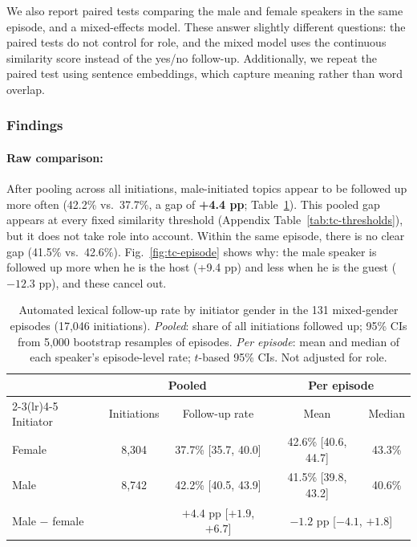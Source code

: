 We also report paired tests comparing the male and female speakers in the same episode, and a mixed-effects model. These answer slightly different questions: the paired tests do not control for role, and the mixed model uses the continuous similarity score instead of the yes/no follow-up. Additionally, we repeat the paired test using sentence embeddings, which capture meaning rather than word overlap.

\subsubsection*{Findings}

\paragraph{Raw comparison:}
After pooling across all initiations, male-initiated topics appear to be followed up more often (42.2\% vs.\ 37.7\%, a gap of \textbf{+4.4 pp}; Table~\ref{tab:tc-descriptive}). This pooled gap appears at every fixed similarity threshold (Appendix Table~\ref{tab:tc-thresholds}), but it does not take role into account. Within the same episode, there is no clear gap (41.5\% vs.\ 42.6\%). Fig.~\ref{fig:tc-episode} shows why: the male speaker is followed up more when he is the host (+9.4 pp) and less when he is the guest ($-12.3$ pp), and these cancel out.

\begin{table}[H]
\centering
\caption{Automated lexical follow-up rate by initiator gender in the 131 mixed-gender episodes (17,046 initiations). \emph{Pooled}: share of all initiations followed up; 95\% CIs from 5,000 bootstrap resamples of episodes. \emph{Per episode}: mean and median of each speaker's episode-level rate; $t$-based 95\% CIs. Not adjusted for role.}
\label{tab:tc-descriptive}
\begin{tabular}{lcccc}
\toprule
 & \multicolumn{2}{c}{Pooled} & \multicolumn{2}{c}{Per episode} \\
\cmidrule(lr){2-3}\cmidrule(lr){4-5}
Initiator & Initiations & Follow-up rate & Mean & Median \\
\midrule
Female & 8,304 & 37.7\% [35.7, 40.0] & 42.6\% [40.6, 44.7] & 43.3\% \\
Male   & 8,742 & 42.2\% [40.5, 43.9] & 41.5\% [39.8, 43.2] & 40.6\% \\
\midrule
Male $-$ female & & $+4.4$ pp [$+1.9$, $+6.7$] & \multicolumn{2}{c}{$-1.2$ pp [$-4.1$, $+1.8$]} \\
\bottomrule
\end{tabular}
\end{table}

